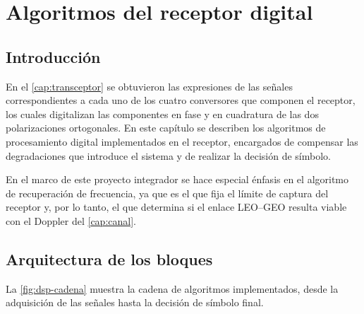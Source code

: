 \chapter{Algoritmos del receptor digital}
\label{cap:dsp}
\section{Introducci\'on}
\label{sec:dsp-intro}

En el \cref{cap:transceptor} se obtuvieron las expresiones de las se\~nales
correspondientes a cada uno de los cuatro conversores que componen el
receptor, los cuales digitalizan las componentes en fase y en cuadratura de
las dos polarizaciones ortogonales. En este cap\'itulo se describen los
algoritmos de procesamiento digital implementados en el receptor, encargados
de compensar las degradaciones que introduce el sistema y de realizar la
decisi\'on de s\'imbolo.

En el marco de este proyecto integrador se hace especial \'enfasis en el
algoritmo de recuperaci\'on de frecuencia, ya que es el que fija el l\'imite
de captura del receptor y, por lo tanto, el que determina si el enlace
LEO--GEO resulta viable con el Doppler del \cref{cap:canal}.

\section{Arquitectura de los bloques}
\label{sec:dsp-arquitectura}

La \cref{fig:dsp-cadena} muestra la cadena de algoritmos implementados, desde
la adquisici\'on de las se\~nales hasta la decisi\'on de s\'imbolo final.

